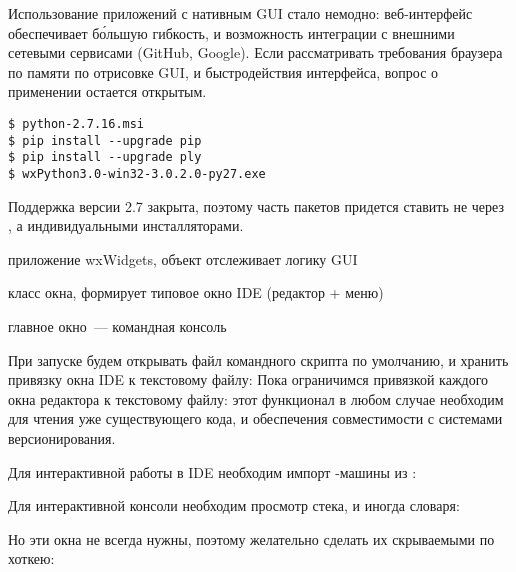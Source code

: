 \label{wx}\secdown

\noindent
Использование приложений с нативным GUI стало немодно: веб-интер\-фейс
обеспечивает б\'{о}льшую гибкость, и возможность
интеграции с внешними сетевыми сервисами (GitHub, Google). Если рассматривать
требования браузера по памяти по отрисовке GUI, и быстродействия интерфейса,
вопрос о применении  остается открытым.


\begin{verbatim}
$ python-2.7.16.msi
$ pip install --upgrade pip
$ pip install --upgrade ply
$ wxPython3.0-win32-3.0.2.0-py27.exe
\end{verbatim}

\noindent
Поддержка версии 2.7 закрыта, поэтому часть пакетов придется ставить не через
, а индивидуальными инсталляторами.


\clearpage
{}

\begin{description}[nosep]
\item[ide] приложение wxWidgets, объект отслеживает логику GUI
\item[ideWindow] класс окна, формирует типовое окно IDE (редактор + меню)
\item[ideConsole] главное окно\ --- командная консоль
\end{description}



\clearpage
{}

\clearpage
При запуске будем открывать файл командного скрипта по умолчанию, и хранить
привязку окна IDE к текстовому файлу:
Пока ограничимся привязкой каждого окна редактора к текстовому файлу: этот
функционал в любом случае необходим для чтения уже существующего кода, и
обеспечения совместимости с системами версионирования.
\clearpage
{}

\clearpage
Для интерактивной работы в IDE необходим импорт \F-машины из \metal:

\noindent
Для интерактивной консоли необходим просмотр стека, и иногда словаря:

\noindent
Но эти окна не всегда нужны, поэтому желательно сделать их скрываемыми по
хоткею:


\secup